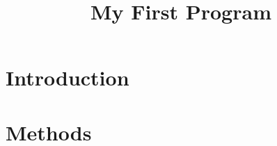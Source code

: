 \documentclass{article}
\title{My First Program}
\begin{document}
    \pagestyle{fancy}
    \fancyhead{}
    \maketitle
    \section{Introduction}
    \lipsum[1][3]
    \section{Methods}
    \lipsum[1][2]
\end{document}
